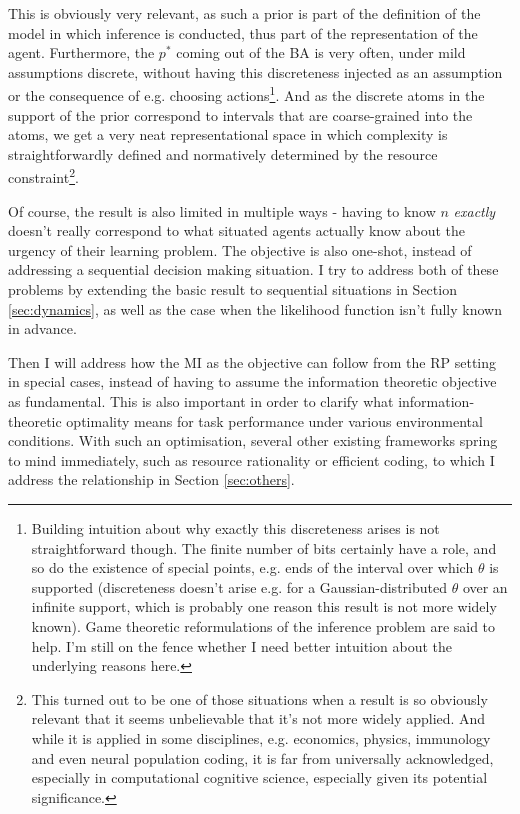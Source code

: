 \documentclass{article}
\begin{document}
This is obviously very relevant, as such a prior is part of the definition of the model in which inference is conducted, thus part of the representation of the agent. Furthermore, the $p^*$ coming out of the BA is very often, under mild assumptions discrete, without having this discreteness injected as an assumption or the consequence of e.g. choosing actions\footnote{Building intuition about why exactly this discreteness arises is not straightforward though. The finite number of bits certainly have a role, and so do the existence of special points, e.g. ends of the interval over which $\theta$ is supported (discreteness doesn't arise e.g. for a Gaussian-distributed $\theta$ over an infinite support, which is probably one reason this result is not more widely known). Game theoretic reformulations of the inference problem are said to help. I'm still on the fence whether I need better intuition about the underlying reasons here.}. And as the discrete atoms in the support of the prior correspond to intervals that are coarse-grained into the atoms, we get a very neat representational space in which complexity is straightforwardly defined and normatively determined by the resource constraint\footnote{This turned out to be one of those situations when a result is so obviously relevant that it seems unbelievable that it's not more widely applied. And while it is applied in some disciplines, e.g. economics\cite{jung2019discrete}, physics\cite{shamai1990capacity}, immunology\cite{mayer2015well} and even neural population coding\cite{bethge2003optimal, nikitin2009neural, shao2023efficient}, it is far from universally acknowledged, especially in computational cognitive science, especially given its potential significance.}. 

Of course, the result is also limited in multiple ways - having to know $n$ \emph{exactly} doesn't really correspond to what situated agents actually know about the urgency of their learning problem. The objective is also one-shot, instead of addressing a sequential decision making situation. I try to address both of these problems by extending the basic result to sequential situations in Section \ref{sec:dynamics}, as well as the case when the likelihood function isn't fully known in advance. 

Then I will address how the MI as the objective can follow from the RP setting in special cases, instead of having to assume the information theoretic objective as fundamental. This is also important in order to clarify what information-theoretic optimality means for task performance under various environmental conditions. With such an optimisation, several other existing frameworks spring to mind immediately, such as resource rationality or efficient coding, to which I address the relationship in Section \ref{sec:others}.
\end{document}
